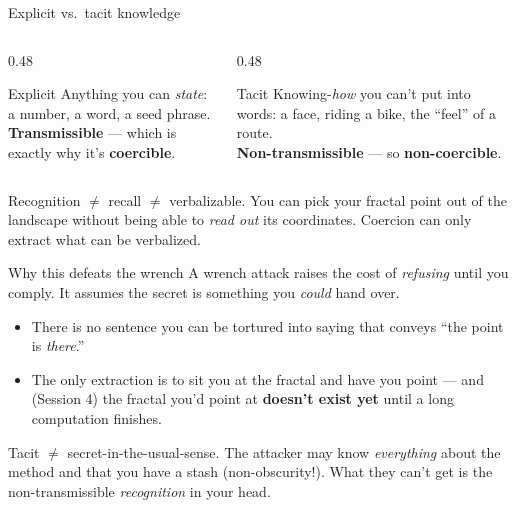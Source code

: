 \documentclass[aspectratio=169,11pt]{beamer}
\begin{document}
\begin{frame}{Explicit vs.\ tacit knowledge}
  \begin{columns}[T]
    \begin{column}{0.48\textwidth}
      \begin{block}{Explicit}
        \footnotesize Anything you can \emph{state}: a number, a word, a seed
        phrase. \\[4pt]\textbf{Transmissible} --- which is exactly why it's
        \textbf{coercible}.
      \end{block}
    \end{column}
    \begin{column}{0.48\textwidth}
      \begin{block}{Tacit}
        \footnotesize Knowing-\emph{how} you can't put into words: a face, riding
        a bike, the ``feel'' of a route. \\[4pt]\textbf{Non-transmissible} ---
        so \textbf{non-coercible}.
      \end{block}
    \end{column}
  \end{columns}
  \vspace{8pt}
  \begin{keyidea}
    Recognition $\neq$ recall $\neq$ verbalizable. You can pick your fractal
    point out of the landscape without being able to \emph{read out} its
    coordinates. Coercion can only extract what can be verbalized.
  \end{keyidea}
\end{frame}


\begin{frame}{Why this defeats the wrench}
  A wrench attack raises the cost of \emph{refusing} until you comply. It assumes
  the secret is something you \emph{could} hand over.
  \vspace{6pt}
  \begin{itemize}
    \item There is no sentence you can be tortured into saying that conveys
      ``the point is \emph{there}.''
    \item The only extraction is to sit you at the fractal and have you point ---
      and (Session 4) the fractal you'd point at \textbf{doesn't exist yet} until
      a long computation finishes.
  \end{itemize}
  \vspace{4pt}
  \begin{pitfall}
    Tacit $\neq$ secret-in-the-usual-sense. The attacker may know \emph{everything}
    about the method and that you have a stash (non-obscurity!). What they can't
    get is the non-transmissible \emph{recognition} in your head.
  \end{pitfall}
\end{frame}
\end{document}
